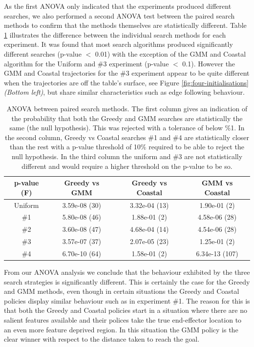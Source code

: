 As the first ANOVA only indicated that the experiments produced different searches,
we also performed a second ANOVA test between the paired search methods to confirm that the methods themselves are statistically different.
Table \ref{fig:anova-2} illustrates the difference between the individual search methods for each experiment. 
It was found that most search algorithms produced significantly different searches (p-value $<$ 0.01) with
the exception of the GMM and Coastal algorithm for the Uniform and \#3 experiment (p-value $<$ 0.1). 
However the GMM and Coastal trajectories for the \#3 experiment appear to be quite different when the trajectories 
are off the table's surface, see Figure \ref{fig:four-initialisations} \textit{(Bottom left)}, but share similar 
characteristics such as edge following behaviour.

\begin{table}
 \centering
 \begin{tabular}{|c|c|c|c|}
 \hline
   p-value (F)   &  Greedy vs GMM      &     Greedy vs Coastal        &  GMM vs Coastal     \\\hline
  Uniform & 3.59e-08 (30)  &   3.32e-04 (13) 		     &  1.90e-01 (2)  \cellcolor{Gray}\\
\#1  	  & 5.80e-08 (46) &  1.88e-01 (2) \cellcolor{Gray} &  4.58e-06 (28)\\
\#2	  & 3.60e-08 (47) &  4.68e-04 (14)		    &  4.54e-06 (28) \\
\#3	  & 3.57e-07 (37) &  2.07e-05 (23)		    &  1.25e-01 (2) \cellcolor{Gray} \\
\#4	  & 6.70e-10 (64) &  1.58e-01 (2) \cellcolor{Gray} &  6.34e-13 (107) \\ \hline
\end{tabular}
\caption{ANOVA between paired search methods. The first column gives an indication of the probability that both the Greedy 
and GMM searches are statistically the same (the null hypothesis). This was rejected with a tolerance of below \%1. 
In the second column, Greedy vs Coastal searches \#1 and \#4 are statistically closer 
than the rest with a p-value threshold of 10\% required to be able to reject the null hypothesis. 
In the third column the uniform and \#3 are not statistically different and would require a higher threshold on the p-value to be so.}
\label{fig:anova-2}
\end{table}

From our ANOVA analysis we conclude that the behaviour exhibited by the three search strategies is 
significantly different. This is certainly the case for the Greedy and GMM methods, even though in 
certain situations the Greedy and Coastal policies display similar behaviour such as in experiment \#1.
The reason for this is that both the Greedy and Coastal policies start in a situation where there are no salient features available
and their polices take the true end-effector location to an even more feature deprived 
region. In this situation the GMM policy is the clear winner with respect to the distance taken to reach
the goal. 


